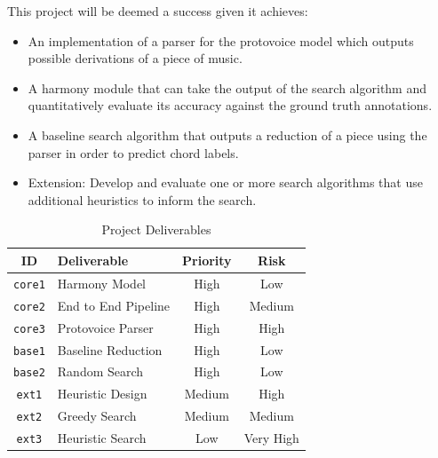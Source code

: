 \documentclass[12pt,a4paper,twoside,openright]{report} \usepackage[pdfborder={0 0 0}]{hyperref}    %
\theoremstyle{definition} \newtheorem{definition}{Definition}[section]
\begin{document}
This project will be deemed a success given it achieves: \begin{itemize} \item An implementation of a parser for the
  protovoice model which outputs possible derivations of a piece of music. \item A harmony module that can take the
  output of the search algorithm and quantitatively evaluate its accuracy against the ground truth annotations. \item
  A baseline search algorithm that outputs a reduction of a piece using the parser in order to predict chord labels.
\item Extension: Develop and evaluate one or more search algorithms that use additional heuristics to inform the search.
\end{itemize} 

\begin{table}[h] \caption{Project Deliverables} \vspace{\baselineskip} \label{tab:deliverables} \centering
  \begin{tabularx}{0.9\textwidth}{cXcc} {\large \textbf{ID}} & \large \textbf{Deliverable} & \large \textbf{Priority}
  & \large \textbf{Risk} \\ \toprule \texttt{core1} & Harmony Model & High & Low \\ \texttt{core2} & End to End Pipeline
  & High & Medium \\ \texttt{core3} & Protovoice Parser & High & High \\ \texttt{base1} & Baseline Reduction & High
  & Low \\ \texttt{base2} & Random Search & High & Low \\ \texttt{ext1} & Heuristic Design & Medium & High \\
  \texttt{ext2} & Greedy Search & Medium & Medium \\ \texttt{ext3} & Heuristic Search & Low & Very High \\
\end{tabularx} \end{table}
\end{document}
